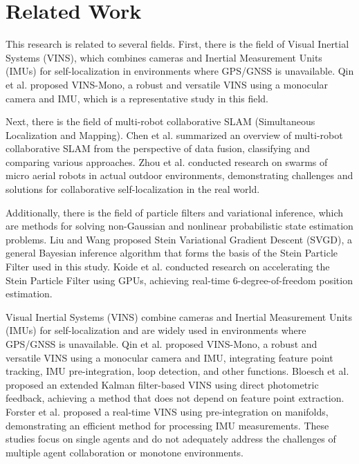 \documentclass[a4paper,fleqn,10pt,twocolumn]{SICE_ISCS}
\begin{document}
\section{Related Work}
This research is related to several fields. First, there is the field of Visual Inertial Systems (VINS), which combines cameras and Inertial Measurement Units (IMUs) for self-localization in environments where GPS/GNSS is unavailable. Qin et al. \cite{Qin2018} proposed VINS-Mono, a robust and versatile VINS using a monocular camera and IMU, which is a representative study in this field.

Next, there is the field of multi-robot collaborative SLAM (Simultaneous Localization and Mapping). Chen et al. \cite{Chen2021} summarized an overview of multi-robot collaborative SLAM from the perspective of data fusion, classifying and comparing various approaches. Zhou et al. \cite{Zhou2018} conducted research on swarms of micro aerial robots in actual outdoor environments, demonstrating challenges and solutions for collaborative self-localization in the real world.

Additionally, there is the field of particle filters and variational inference, which are methods for solving non-Gaussian and nonlinear probabilistic state estimation problems. Liu and Wang \cite{Liu2016} proposed Stein Variational Gradient Descent (SVGD), a general Bayesian inference algorithm that forms the basis of the Stein Particle Filter used in this study. Koide et al. \cite{Koide2021} conducted research on accelerating the Stein Particle Filter using GPUs, achieving real-time 6-degree-of-freedom position estimation.

Visual Inertial Systems (VINS) combine cameras and Inertial Measurement Units (IMUs) for self-localization and are widely used in environments where GPS/GNSS is unavailable. Qin et al. \cite{Qin2018} proposed VINS-Mono, a robust and versatile VINS using a monocular camera and IMU, integrating feature point tracking, IMU pre-integration, loop detection, and other functions. Bloesch et al. \cite{Bloesch2017} proposed an extended Kalman filter-based VINS using direct photometric feedback, achieving a method that does not depend on feature point extraction. Forster et al. \cite{Forster2017} proposed a real-time VINS using pre-integration on manifolds, demonstrating an efficient method for processing IMU measurements. These studies focus on single agents and do not adequately address the challenges of multiple agent collaboration or monotone environments.
\end{document}
